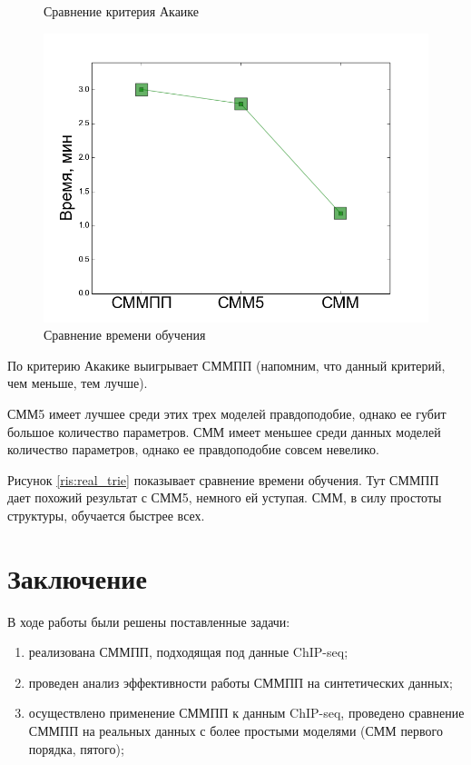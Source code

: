 \documentclass{matmex-diploma-custom}
\begin{document}
\begin{figure}[h!]
\begin{minipage}[b]{0.32 \textwidth}
	\centering
	\caption{ Сравнение критерия Акаике }
	\label{ris:real_comp_aic}
\end{minipage}
\hfill
\begin{minipage}[b]{0.32 \textwidth}
	\includegraphics[scale=0.28]{img/real/time.png}
	\centering
	\caption{ Сравнение времени обучения }
	\label{ris:real_comp_time}
\end{minipage}
\end{figure}

По критерию Акакике выигрывает СММПП (напомним, что данный критерий, чем меньше, тем лучше).

СММ5 имеет лучшее среди этих трех моделей правдоподобие, однако ее губит большое количество параметров. 
СММ имеет меньшее среди данных моделей количество параметров, однако ее правдоподобие совсем невелико.

Рисунок \ref{ris:real_trie} показывает сравнение времени обучения. Тут СММПП дает похожий результат с СММ5, немного ей уступая. СММ, в силу простоты структуры, обучается быстрее всех.


\section*{Заключение}
В ходе работы были решены поставленные задачи:
\begin{enumerate}
\item
реализована СММПП, подходящая под данные ChIP-seq;
\item
проведен анализ эффективности работы СММПП на
синтетических данных; 
\item
осуществлено применение СММПП к
данным ChIP-seq, проведено сравнение СММПП на реальных данных с более простыми моделями (СММ первого порядка, пятого);
\end{enumerate}






\end{document}
